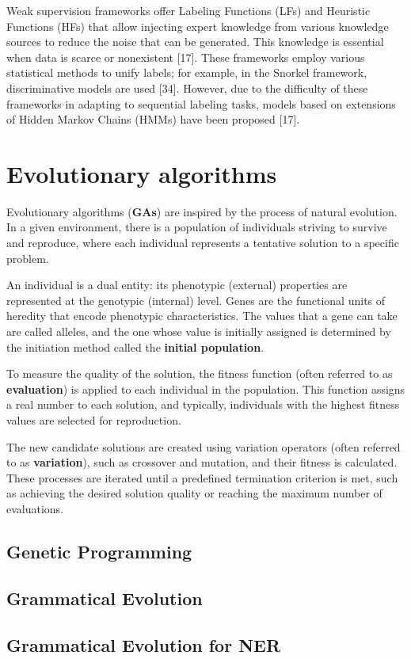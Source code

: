 Weak supervision frameworks offer Labeling Functions (LFs) and Heuristic Functions (HFs) that allow injecting expert knowledge from various knowledge sources to reduce the noise that can be generated. This knowledge is essential when data is scarce or nonexistent [17]. These frameworks employ various statistical methods to unify labels; for example, in the Snorkel framework, discriminative models are used [34]. However, due to the difficulty of these frameworks in adapting to sequential labeling tasks, models based on extensions of Hidden Markov Chains (HMMs) have been proposed [17].

\section{Evolutionary algorithms}


Evolutionary algorithms (\textbf{GAs}) are inspired by the process of natural evolution. In a given environment, there is a population of individuals striving to survive and reproduce, where each individual represents a tentative solution to a specific problem\cite{eiben-2015-speech}.

An individual is a dual entity: its phenotypic (external) properties are represented at the genotypic (internal) level. Genes are the functional units of heredity that encode phenotypic characteristics\cite{eiben-2015-speech}. The values that a gene can take are called alleles, and the one whose value is initially assigned is determined by the initiation method called the \textbf{initial population}.

To measure the quality of the solution, the fitness function (often referred to as \textbf{evaluation}) is applied to each individual in the population\cite{eiben-2015-speech}. This function assigns a real number to each solution, and typically, individuals with the highest fitness values are selected for reproduction.

The new candidate solutions are created using variation operators (often referred to as \textbf{variation}), such as crossover and mutation, and their fitness is calculated. These processes are iterated until a predefined termination criterion is met, such as achieving the desired solution quality or reaching the maximum number of evaluations.


\subsection{Genetic Programming}

\subsection{Grammatical Evolution}


\subsection{Grammatical Evolution for NER}
